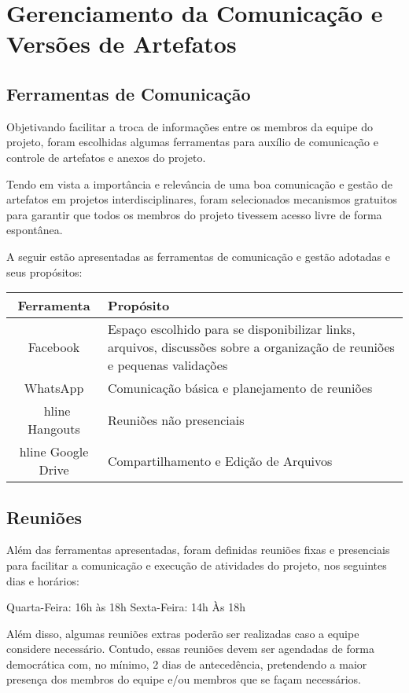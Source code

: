 \chapter[Gerenciamento da Comunicação e Versões de Artefatos]{Gerenciamento da Comunicação e Versões de Artefatos}
\section{Ferramentas de Comunicação}
Objetivando facilitar a troca de informações entre os membros da equipe do projeto, foram escolhidas algumas ferramentas para auxílio de comunicação e controle de artefatos e anexos do projeto. 

Tendo em vista a importância e relevância de uma boa comunicação e gestão de artefatos em projetos interdisciplinares, foram selecionados mecanismos gratuitos para garantir que todos os membros do projeto tivessem acesso livre de forma espontânea.

A seguir estão apresentadas as ferramentas de comunicação e gestão adotadas e seus propósitos: 

\begin{table}[h]
\centering
\begin{tabular}{|c|p{7cm}|} \hline

Ferramenta & Propósito \\ \hline
Facebook & Espaço escolhido para se disponibilizar  links,  arquivos, discussões sobre a organização de reuniões e pequenas validações \\ \hline
WhatsApp & Comunicação básica e planejamento de reuniões \\\ hline
Hangouts & Reuniões não presenciais \\hline
Google Drive & Compartilhamento e Edição de Arquivos \\ \hline
\end{tabular}
\end{table}
\section{Reuniões}
Além das ferramentas apresentadas, foram definidas reuniões fixas e presenciais para facilitar a comunicação e execução de atividades do projeto, nos seguintes dias e horários:

Quarta-Feira: 16h às 18h 
Sexta-Feira: 14h Às 18h 

Além disso, algumas reuniões extras poderão ser realizadas caso a equipe considere necessário. Contudo, essas reuniões devem ser agendadas de forma democrática com, no mínimo, 2 dias de antecedência, pretendendo a maior presença dos membros do equipe e/ou membros que se façam necessários.
